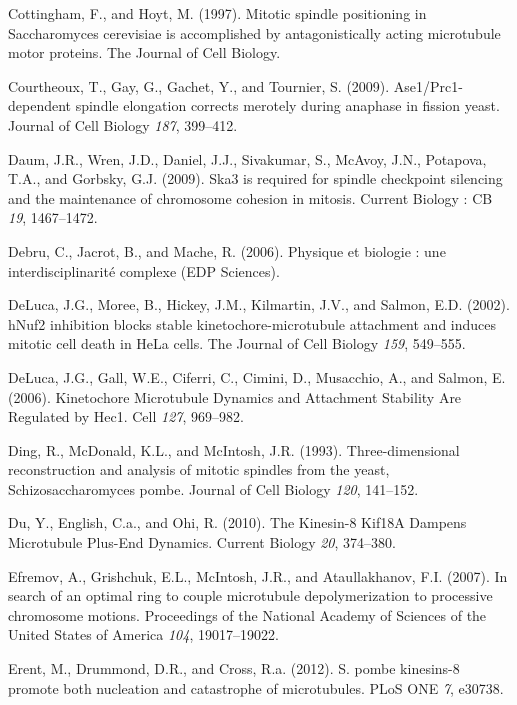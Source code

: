 \documentclass[12pt,a4paper,twoside,openright]{book}
\begin{document}
\hypertarget{ref-Cottingham1997}{}
Cottingham, F., and Hoyt, M. (1997). Mitotic spindle positioning in
Saccharomyces cerevisiae is accomplished by antagonistically acting
microtubule motor proteins. The Journal of Cell Biology.

\hypertarget{ref-Courtheoux2009}{}
Courtheoux, T., Gay, G., Gachet, Y., and Tournier, S. (2009).
Ase1/Prc1-dependent spindle elongation corrects merotely during anaphase
in fission yeast. Journal of Cell Biology \emph{187}, 399--412.

\hypertarget{ref-Daum2009}{}
Daum, J.R., Wren, J.D., Daniel, J.J., Sivakumar, S., McAvoy, J.N.,
Potapova, T.A., and Gorbsky, G.J. (2009). Ska3 is required for spindle
checkpoint silencing and the maintenance of chromosome cohesion in
mitosis. Current Biology : CB \emph{19}, 1467--1472.

\hypertarget{ref-Debru}{}
Debru, C., Jacrot, B., and Mache, R. (2006). Physique et biologie : une
interdisciplinarité complexe (EDP Sciences).

\hypertarget{ref-DeLuca2002}{}
DeLuca, J.G., Moree, B., Hickey, J.M., Kilmartin, J.V., and Salmon, E.D.
(2002). hNuf2 inhibition blocks stable kinetochore-microtubule
attachment and induces mitotic cell death in HeLa cells. The Journal of
Cell Biology \emph{159}, 549--555.

\hypertarget{ref-DeLuca2006}{}
DeLuca, J.G., Gall, W.E., Ciferri, C., Cimini, D., Musacchio, A., and
Salmon, E. (2006). Kinetochore Microtubule Dynamics and Attachment
Stability Are Regulated by Hec1. Cell \emph{127}, 969--982.

\hypertarget{ref-Ding1993a}{}
Ding, R., McDonald, K.L., and McIntosh, J.R. (1993). Three-dimensional
reconstruction and analysis of mitotic spindles from the yeast,
Schizosaccharomyces pombe. Journal of Cell Biology \emph{120}, 141--152.

\hypertarget{ref-Du2010}{}
Du, Y., English, C.a., and Ohi, R. (2010). The Kinesin-8 Kif18A Dampens
Microtubule Plus-End Dynamics. Current Biology \emph{20}, 374--380.

\hypertarget{ref-Efremov2007}{}
Efremov, A., Grishchuk, E.L., McIntosh, J.R., and Ataullakhanov, F.I.
(2007). In search of an optimal ring to couple microtubule
depolymerization to processive chromosome motions. Proceedings of the
National Academy of Sciences of the United States of America \emph{104},
19017--19022.

\hypertarget{ref-Erent2012}{}
Erent, M., Drummond, D.R., and Cross, R.a. (2012). S. pombe kinesins-8
promote both nucleation and catastrophe of microtubules. PLoS ONE
\emph{7}, e30738.
\end{document}

